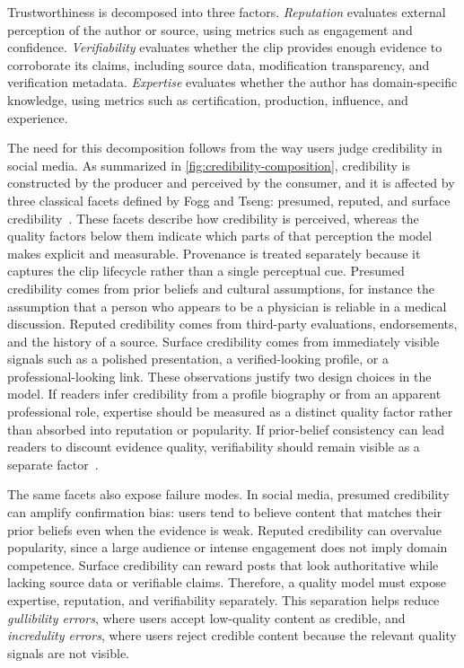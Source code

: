 \documentclass[sigconf, nonacm]{acmart}
\begin{document}
Trustworthiness is decomposed into three factors. \emph{Reputation} evaluates
external perception of the author or source, using metrics such as engagement and
confidence. \emph{Verifiability} evaluates whether the clip provides enough
evidence to corroborate its claims, including source data, modification
transparency, and verification metadata. \emph{Expertise} evaluates whether the
author has domain-specific knowledge, using metrics such as certification,
production, influence, and experience.

The need for this decomposition follows from the way users judge credibility in
social media. As summarized in \autoref{fig:credibility-composition}, credibility
is constructed by the producer and perceived by the consumer, and it is affected by
three classical facets defined by Fogg and Tseng: presumed, reputed, and surface
credibility~\cite{FoggTseng1999}. These facets describe how credibility is
perceived, whereas the quality factors below them indicate which parts of that
perception the model makes explicit and measurable. Provenance is treated
separately because it captures the clip lifecycle rather than a single perceptual
cue. Presumed
credibility comes from prior beliefs and cultural assumptions, for instance the
assumption that a person who appears to be a physician is reliable in a medical
discussion. Reputed credibility comes from third-party evaluations, endorsements,
and the history of a source. Surface credibility comes from immediately visible
signals such as a polished presentation, a verified-looking profile, or a
professional-looking link. These observations justify two design choices in the
model. If readers infer credibility from a profile biography or from an apparent
professional role, expertise should be measured as a distinct quality factor
rather than absorbed into reputation or popularity. If prior-belief consistency
can lead readers to discount evidence quality, verifiability should remain
visible as a separate factor~\cite{Kuutila2024}.

The same facets also expose failure modes. In social media,
presumed credibility can amplify confirmation bias: users tend to believe content
that matches their prior beliefs even when the evidence is weak. Reputed
credibility can overvalue popularity, since a large audience or intense engagement
does not imply domain competence. Surface credibility can reward posts that look
authoritative while lacking source data or verifiable claims. Therefore, a quality
model must expose expertise, reputation, and verifiability separately. This
separation helps reduce \emph{gullibility errors}, where users accept low-quality
content as credible, and \emph{incredulity errors}, where users reject credible
content because the relevant quality signals are not visible.
\end{document}
